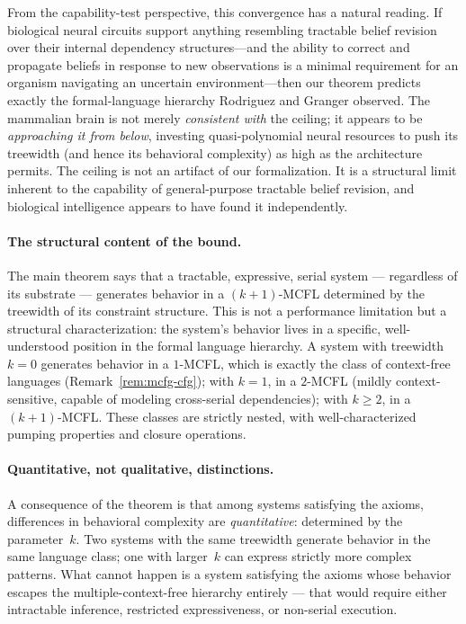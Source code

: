\documentclass[11pt,a4paper]{article}
\theoremstyle{plain}
\theoremstyle{definition}
\theoremstyle{remark}
\begin{document}
From the capability-test perspective, this convergence has a natural reading.
If biological neural circuits support anything resembling tractable belief revision over their internal dependency structures---and the ability to correct and propagate beliefs in response to new observations is a minimal requirement for an organism navigating an uncertain environment---then our theorem predicts exactly the formal-language hierarchy Rodriguez and Granger observed.
The mammalian brain is not merely \emph{consistent with} the ceiling; it appears to be \emph{approaching it from below}, investing quasi-polynomial neural resources to push its treewidth (and hence its behavioral complexity) as high as the architecture permits.
The ceiling is not an artifact of our formalization.
It is a structural limit inherent to the capability of general-purpose tractable belief revision, and biological intelligence appears to have found it independently.

\paragraph{The structural content of the bound.}
The main theorem says that a tractable, expressive, serial system --- regardless of its substrate --- generates behavior in a $(k{+}1)$-MCFL determined by the treewidth of its constraint structure.
This is not a performance limitation but a structural characterization: the system's behavior lives in a specific, well-understood position in the formal language hierarchy.
A system with treewidth $k = 0$ generates behavior in a $1$-MCFL, which is exactly the class of context-free languages (Remark~\ref{rem:mcfg-cfg}); with $k = 1$, in a $2$-MCFL (mildly context-sensitive, capable of modeling cross-serial dependencies); with $k \geq 2$, in a $(k{+}1)$-MCFL.
These classes are strictly nested, with well-characterized pumping properties and closure operations.

\paragraph{Quantitative, not qualitative, distinctions.}
A consequence of the theorem is that among systems satisfying the axioms, differences in behavioral complexity are \emph{quantitative}: determined by the parameter~$k$.
Two systems with the same treewidth generate behavior in the same language class; one with larger~$k$ can express strictly more complex patterns.
What cannot happen is a system satisfying the axioms whose behavior escapes the multiple-context-free hierarchy entirely --- that would require either intractable inference, restricted expressiveness, or non-serial execution.
\end{document}
